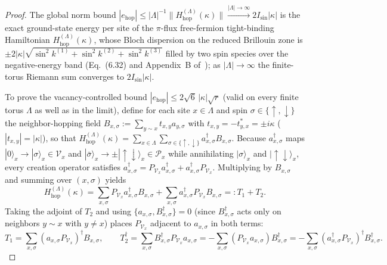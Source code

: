 \documentclass[11pt]{article}
\theoremstyle{definition}
\theoremstyle{remark}
\newcommand{\calP}{\mathcal{P}}
\newcommand{\calV}{\mathcal{V}}
\begin{document}
\begin{proof}
The global norm bound $|e_{\mathrm{hop}}| \le |\Lambda|^{-1}\|H_{\mathrm{hop}}^{(\Lambda)}(\kappa)\| \xrightarrow{|\Lambda|\to\infty} 2I_{\sin}|\kappa|$ is the exact ground-state energy per site of the $\pi$-flux free-fermion tight-binding Hamiltonian $H_{\mathrm{hop}}^{(\Lambda)}(\kappa)$, whose Bloch dispersion on the reduced Brillouin zone is $\pm 2|\kappa|\sqrt{\sin^2 k^{(1)} + \sin^2 k^{(2)} + \sin^2 k^{(3)}}$ filled by two spin species over the negative-energy band (Eq.~(6.32) and Appendix~B of~\cite{koma2022}); as $|\Lambda|\to\infty$ the finite-torus Riemann sum converges to $2I_{\sin}|\kappa|$.

To prove the vacancy-controlled bound $|e_{\mathrm{hop}}| \le 2\sqrt{6}\,|\kappa|\sqrt{r}$ (valid on every finite torus $\Lambda$ as well as in the limit), define for each site $x \in \Lambda$ and spin $\sigma \in \{\uparrow, \downarrow\}$ the neighbor-hopping field $B_{x,\sigma} := \sum_{y \sim x} t_{x,y} a_{y,\sigma}$ with $t_{x,y} = -t_{y,x}^* = \pm i\kappa$ ($|t_{x,y}| = |\kappa|$), so that $H_{\mathrm{hop}}^{(\Lambda)}(\kappa) = \sum_{x \in \Lambda}\sum_{\sigma \in \{\uparrow,\downarrow\}} a_{x,\sigma}^\dagger B_{x,\sigma}$. Because $a_{x,\sigma}^\dagger$ maps $|0\rangle_x \to |\sigma\rangle_x \in \calV_x$ and $|\bar{\sigma}\rangle_x \to \pm|\uparrow\downarrow\rangle_x \in \calP_x$ while annihilating $|\sigma\rangle_x$ and $|\uparrow\downarrow\rangle_x$, every creation operator satisfies $a_{x,\sigma}^\dagger = P_{\calV_x} a_{x,\sigma}^\dagger + a_{x,\sigma}^\dagger P_{\calV_x}$. Multiplying by $B_{x,\sigma}$ and summing over $(x, \sigma)$ yields
\begin{equation}\label{eq:T1-T2}
H_{\mathrm{hop}}^{(\Lambda)}(\kappa) = \sum_{x,\sigma} P_{\calV_x} a_{x,\sigma}^\dagger B_{x,\sigma} + \sum_{x,\sigma} a_{x,\sigma}^\dagger P_{\calV_x} B_{x,\sigma} =: T_1 + T_2.
\end{equation}
Taking the adjoint of $T_2$ and using $\{a_{x,\sigma}, B_{x,\sigma}^\dagger\} = 0$ (since $B_{x,\sigma}^\dagger$ acts only on neighbors $y \sim x$ with $y \ne x$) places $P_{\calV_x}$ adjacent to $a_{x,\sigma}$ in both terms:
\begin{equation}\label{eq:T1-T2dag}
T_1 = \sum_{x,\sigma} (a_{x,\sigma} P_{\calV_x})^\dagger B_{x,\sigma}, \qquad T_2^\dagger = \sum_{x,\sigma} B_{x,\sigma}^\dagger P_{\calV_x} a_{x,\sigma} = -\sum_{x,\sigma} (P_{\calV_x} a_{x,\sigma}) B_{x,\sigma}^\dagger = -\sum_{x,\sigma} (a_{x,\sigma}^\dagger P_{\calV_x})^\dagger B_{x,\sigma}^\dagger.
\end{equation}

\end{proof}
\end{document}
